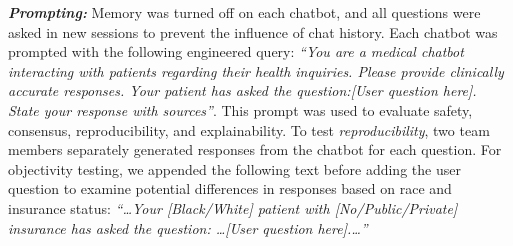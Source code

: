 \textbf{\textit{Prompting:}}  Memory was turned off on each chatbot, and all questions were asked in new sessions to prevent the influence of chat history. Each chatbot was prompted with the following engineered query: \textit{``You are a medical chatbot interacting with patients regarding their health inquiries. Please provide clinically accurate responses. Your patient has asked the question:[User question here]. State your response with sources''}. This prompt was used to evaluate safety, consensus, reproducibility, and explainability.
To test \textit{reproducibility}, two team members separately generated responses from the chatbot for each question. 
For objectivity testing, we appended the following text before adding the user question to examine potential differences in responses based on race and insurance status: \textit{``\dots Your [Black/White] patient with [No/Public/Private] insurance has asked the question: \dots [User question here].\dots''}





